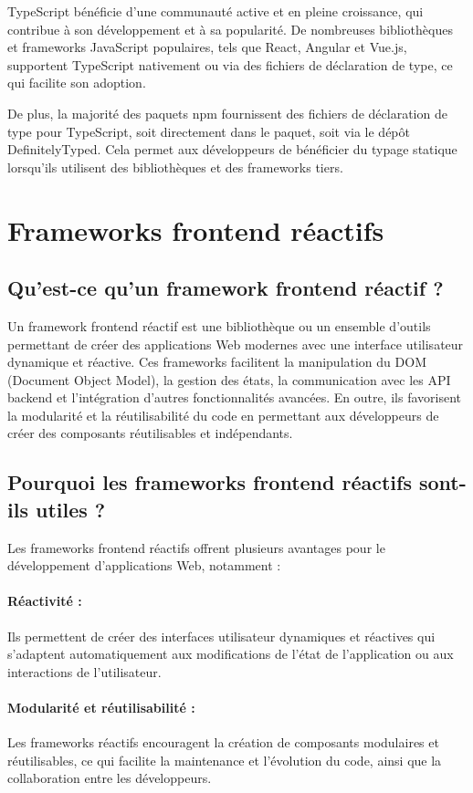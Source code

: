 TypeScript bénéficie d'une communauté active et en pleine croissance, qui contribue à son développement et à sa popularité. De nombreuses bibliothèques et frameworks JavaScript populaires, tels que React, Angular et Vue.js, supportent TypeScript nativement ou via des fichiers de déclaration de type, ce qui facilite son adoption.

De plus, la majorité des paquets \gls{npm} fournissent des fichiers de déclaration de type pour TypeScript, soit directement dans le paquet, soit via le dépôt DefinitelyTyped. Cela permet aux développeurs de bénéficier du typage statique lorsqu'ils utilisent des bibliothèques et des frameworks tiers.

\section{Frameworks frontend réactifs}

\subsection{Qu'est-ce qu'un framework frontend réactif ?}

Un framework frontend réactif est une bibliothèque ou un ensemble d'outils permettant de créer des applications Web modernes avec une interface utilisateur dynamique et réactive. Ces frameworks facilitent la manipulation du \gls{DOM} (Document Object Model), la gestion des états, la communication avec les API backend et l'intégration d'autres fonctionnalités avancées. En outre, ils favorisent la modularité et la réutilisabilité du code en permettant aux développeurs de créer des composants réutilisables et indépendants.

\subsection{Pourquoi les frameworks frontend réactifs sont-ils utiles ?}

Les frameworks frontend réactifs offrent plusieurs avantages pour le développement d'applications Web, notamment :

\paragraph{Réactivité :} Ils permettent de créer des interfaces utilisateur dynamiques et réactives qui s'adaptent automatiquement aux modifications de l'état de l'application ou aux interactions de l'utilisateur.
\paragraph{Modularité et réutilisabilité :} Les frameworks réactifs encouragent la création de composants modulaires et réutilisables, ce qui facilite la maintenance et l'évolution du code, ainsi que la collaboration entre les développeurs.
